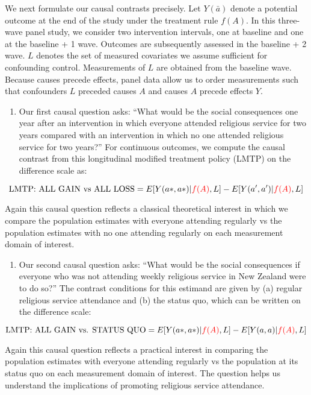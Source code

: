 \documentclass[
  singlecolumn]{article}
\providecommand{\tightlist}{%
  \setlength{\itemsep}{0pt}\setlength{\parskip}{0pt}}\usepackage{longtable,booktabs,array}
\begin{document}
We next formulate our causal contrasts precisely. Let \(Y(\bar{a})\)
denote a potential outcome at the end of the study under the treatment
rule \(f(A)\). In this three-wave panel study, we consider two
intervention intervals, one at baseline and one at the baseline + 1
wave. Outcomes are subsequently assessed in the baseline + 2 wave. \(L\)
denotes the set of measured covariates we assume sufficient for
confounding control. Measurements of \(L\) are obtained from the
baseline wave. Because causes precede effects, panel data allow us to
order measurements such that confounders \(L\) preceded causes \(A\) and
causes \(A\) precede effects \(Y\).

\begin{enumerate}
\def\labelenumi{\arabic{enumi}.}
\tightlist
\item
  Our first causal question asks: ``What would be the social
  consequences one year after an intervention in which everyone attended
  religious service for two years compared with an intervention in which
  no one attended religious service for two years?'' For continuous
  outcomes, we compute the causal contrast from this longitudinal
  modified treatment policy (LMTP) on the difference scale as:
\end{enumerate}

\[ \text{LMTP: ALL GAIN vs ALL LOSS} = E[Y(a*,a*)|\textcolor{red}{f(A)},L] - E[Y(a^\prime,a^\prime)|\textcolor{red}{f(A)},L] \]

Again this causal question reflects a classical theoretical interest in
which we compare the population estimates with everyone attending
regularly vs the population estimates with no one attending regularly on
each measurement domain of interest.

\begin{enumerate}
\def\labelenumi{\arabic{enumi}.}
\setcounter{enumi}{1}
\tightlist
\item
  Our second causal question asks: ``What would be the social
  consequences if everyone who was not attending weekly religious
  service in New Zealand were to do so?'' The contrast conditions for
  this estimand are given by (a) regular religious service attendance
  and (b) the status quo, which can be written on the difference scale:
\end{enumerate}

\[  \text{LMTP: ALL GAIN vs. STATUS QUO}  = E[Y(a*,a*)|\textcolor{red}{f(A)},L] - E[Y(a,a)|\textcolor{red}{f(A)},L] \]

Again this causal question reflects a practical interest in comparing
the population estimates with everyone attending regularly vs the
population at its status quo on each measurement domain of interest. The
question helps us understand the implications of promoting religious
service attendance.
\end{document}
